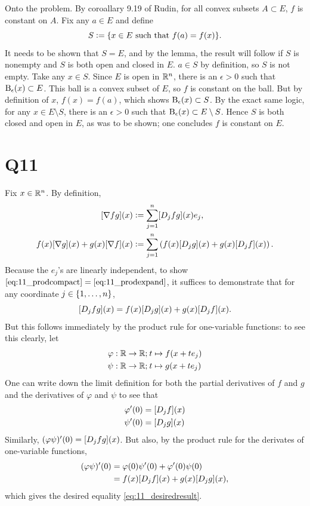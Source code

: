 \documentclass[12pt]{article}
\begin{document}
Onto the problem. 
By coroallary 9.19 of Rudin, for all convex subsets $A \subset E$, $f$ is constant on $A$. 
Fix any $a \in E$ and define 
$$S \vcentcolon= \{x \in E \text{ such that } f(a) = f(x)\}.$$
It needs to be shown that $S = E$, and by the lemma, the result will follow if $S$ is nonempty and $S$ is both open and closed in $E$. 
$a \in S$ by definition, so $S$ is not empty. 
Take any $x \in S$. 
Since $E$ is open in $\mathbb{R}^n$, there is an $\epsilon > 0$ such that $\text{B}_{\epsilon}(x) \subset E$. 
This ball is a convex subset of $E$, so $f$ is constant on the ball. 
But by definition of $x$, $f(x) = f(a)$, which shows $\text{B}_{\epsilon}(x) \subset S$. 
By the exact same logic, for any $x \in E \setminus S$, there is an $\epsilon > 0$ such that $\text{B}_{\epsilon}(x) \subset E \setminus S$. 
Hence $S$ is both closed and open in $E$, as was to be shown; 
one concludes $f$ is constant on $E$. 

\section*{Q11}
Fix $x \in \mathbb{R}^n$. 
By definition, 
\begin{align}
  [\nabla fg](x) & \vcentcolon= \sum_{j = 1}^{n} [D_{j}fg](x) e_j, \label{eq:11_prodcompact} \\ 
  f(x)[\nabla g](x) + g(x) [\nabla f](x) & \vcentcolon= \sum_{j = 1}^{n} \left( f(x) [D_{j}g](x) + g(x) [D_{j}f](x) \right). \label{eq:11_prodexpand}
\end{align}
Because the $e_j$'s are linearly independent, to show $\eqref{eq:11_prodcompact}  = \eqref{eq:11_prodexpand} $,  it suffices to demonstrate that for any coordinate $j \in \{1, \ldots, n\}$, 
\begin{equation} \label{eq:11_desiredresult}
  [D_{j}fg](x) = f(x) [D_{j}g](x) + g(x) [D_{j}f](x).
\end{equation}
But this follows immediately by the product rule for one-variable functions: 
to see this clearly, let 
\begin{align*}
  \varphi: \mathbb{R} \rightarrow \mathbb{R}; \: & t \mapsto f(x + te_j) \\ 
  \psi: \mathbb{R} \rightarrow \mathbb{R}; \: & t \mapsto g(x + te_j)
\end{align*}
One can write down the limit definition for both the partial derivatives of $f$ and $g$ and the derivatives of $\varphi$ and $\psi$ to see that 
\begin{align*}
  \varphi'(0) & = [D_{j}f](x) \\ 
  \psi'(0) & = [D_{j}g](x)
\end{align*}
Similarly, $(\varphi \psi)'(0) = [D_{j}fg](x)$. 
But also, by the product rule for the derivates of one-variable functions, 
\begin{align*}
  (\varphi \psi)'(0) & = \varphi(0) \psi'(0) + \varphi'(0) \psi(0)  \\ 
                     & = f(x)[D_{j}f](x) + g(x)[D_{j}g](x),
\end{align*}
which gives the desired equality \eqref{eq:11_desiredresult}.
\end{document}
